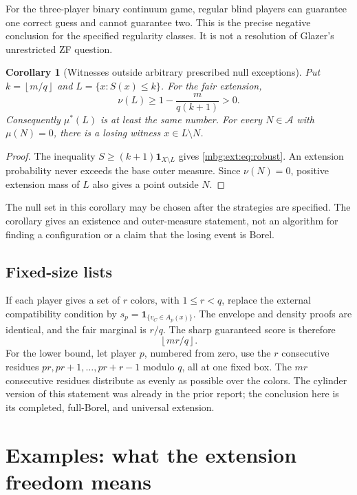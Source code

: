 \documentclass[11pt,letterpaper]{article}
\newtheorem{corollary}[theorem]{Corollary}
\theoremstyle{definition}
\newcommand{\ind}{\mathbf 1}
\newcommand{\floor}[1]{\left\lfloor #1\right\rfloor}
\newcommand{\A}{\mathcal A}
\begin{document}
For the three-player binary continuum game, regular blind players can guarantee one correct guess and cannot guarantee two. This is the precise negative conclusion for the specified regularity classes. It is not a resolution of Glazer's unrestricted ZF question.

\begin{corollary}[Witnesses outside arbitrary prescribed null exceptions]
\label{mbg:ext:cor:robust}
Put $k=\floor{m/q}$ and $L=\{x:S(x)\le k\}$. For the fair extension,
\begin{equation}
\nu(L)\ge1-\frac{m}{q(k+1)}>0.
\label{mbg:ext:eq:robust}
\end{equation}
Consequently $\mu^*(L)$ is at least the same number. For every $N\in\A$ with $\mu(N)=0$, there is a losing witness $x\in L\setminus N$.
\end{corollary}
\begin{proof}
The inequality $S\ge(k+1)\ind_{X\setminus L}$ gives \eqref{mbg:ext:eq:robust}. An extension probability never exceeds the base outer measure. Since $\nu(N)=0$, positive extension mass of $L$ also gives a point outside $N$.
\end{proof}

The null set in this corollary may be chosen after the strategies are specified. The corollary gives an existence and outer-measure statement, not an algorithm for finding a configuration or a claim that the losing event is Borel.

\subsection{Fixed-size lists}

If each player gives a set of $r$ colors, with $1\le r<q$, replace the external compatibility condition by $s_p=\ind_{\{v_C\in A_p(x)\}}$. The envelope and density proofs are identical, and the fair marginal is $r/q$. The sharp guaranteed score is therefore
\[
\floor{mr/q}.
\]
For the lower bound, let player $p$, numbered from zero, use the $r$ consecutive residues $pr,pr+1,\ldots,pr+r-1$ modulo $q$, all at one fixed box. The $mr$ consecutive residues distribute as evenly as possible over the colors. The cylinder version of this statement was already in the prior report; the conclusion here is its completed, full-Borel, and universal extension.

\section{Examples: what the extension freedom means}
\label{mbg:ext:sec:examples}
\end{document}
